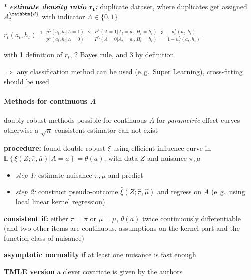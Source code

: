 \documentclass[8pt,twoside]{extarticle}
\begin{document}
\begin{multicols}{2}
 


\noindent $\boldsymbol{*}$ \textit{\textbf{estimate density ratio $\boldsymbol{r_t}$:}} duplicate dataset, where duplicates get assigned $A_t^{\mathbbm{d}}$ with indicator $\Lambda\in\{0,1\}$

\noindent $r_t(a_t,h_t) \! \overset{1}{=} \!\frac{p^\lambda(a_t,h_t|\Lambda =1)}{p^\lambda(a_t,h_t|\Lambda =0)} 
\overset{2}{=} \frac{P^\lambda(\Lambda=1|A_t=a_t, H_t=h_t)}{P^\lambda(\Lambda=0|A_t=a_t, H_t=h_t)}
\overset{3}{=} \frac{u_t^\lambda(a_t,h_t)}{1{-}u_t^\lambda(a_t,h_t)}
$

\noindent with 1 definition of $r_t$, 2 Bayes rule, and 3 by definition

\noindent $\Rightarrow$ any classification method can be used (e.\,g.\ Super Learning), cross-fitting should be used


\paragraph{Methods for continuous \textit{A}} \citep{kennedy2017non}

\noindent doubly robust methods possible for continuous $A$ for \textit{parametric} effect curves otherwise a $\sqrt{n}$ consistent estimator can not exist

\noindent \textbf{procedure:} found double robust $\xi$ using efficient influence curve in 
$\mathbb{E}\left\{\xi(Z;\bar{\pi},\bar{\mu})|A=a\right\}=\theta(a)$, with data $Z$ and nuisance $\pi,\mu$

\begin{itemize}[leftmargin=*, itemsep=0em, topsep=0pt, partopsep=0pt,parsep=0pt]
\item[] \textit{step 1:} estimate nuisance $\pi,\mu$ and predict
\item[] \textit{step 2:} construct pseudo-outcome $\hat{\xi}(Z;\hat{\pi}, \hat{\mu})$ and regress on $A$ (e.\,g.\ using local linear kernel regression)
\end{itemize}

\noindent \textbf{consistent if:} either $\bar{\pi}=\pi$ or $\bar{\mu}=\mu$, $\theta(a)$ twice continuously differentiable (and two other items are continuous, assumptions on the kernel part and the function class of nuisance) 

\noindent \textbf{asymptotic normality} if at least one nuisance is  fast enough

\noindent \textbf{TMLE version} a clever covariate is given by the authors






\end{multicols}






\def\bibpreamble{\textit{If no citation is given, the information is taken from  the book \citep{hernan2020causal}} \vspace{1.5em}}

 
 
\end{document}

